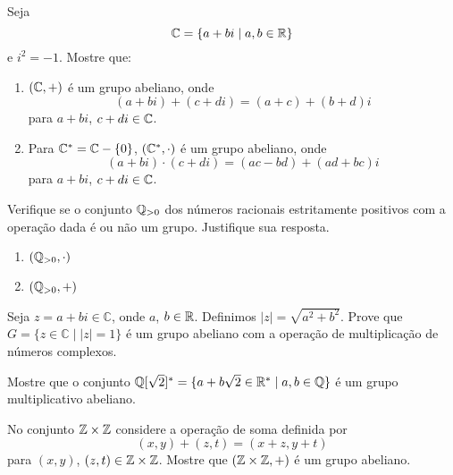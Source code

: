 \documentclass[12pt]{exam}
\begin{document}
    \vspace{.3cm}

    \questao{} Seja
    \[
        \mathbb{C} = \{a + bi \mid a, b \in \mathbb{R}\}
    \]
    e $i^2 = -1$. Mostre que:
    \begin{enumerate}[label=({\alph*})]
        \item $(\mathbb{C}, +)$ é um grupo abeliano, onde
        \[
            (a + bi) + (c + di) = (a + c) + (b + d)i
        \]
        para $a + bi$, $c + di \in \mathbb{C}$.
        \item Para $\mathbb{C}^* = \mathbb{C} - \{0\}$, $(\mathbb{C}^*, \cdot)$ é um grupo abeliano, onde
        \[
            (a + bi)\cdot (c + di) = (ac - bd) + (ad + bc)i
        \]
        para $a + bi$, $c + di \in \mathbb{C}$.
    \end{enumerate}

    \vspace{.3cm}

    \questao{} Verifique se o conjunto $\mathbb{Q}_{>0}$ dos números racionais estritamente positivos com a
     operação dada é ou não um grupo. Justifique sua
    resposta.
    \begin{multicols}{2}
        \begin{enumerate}[label=({\alph*})]
            \item $(\mathbb{Q}_{>0},\cdot)$

            \item $(\mathbb{Q}_{>0}, +)$
        \end{enumerate}
    \end{multicols}

    \vspace{.3cm}

    \questao{} Seja $z  = a + bi \in \mathbb{C}$, onde $a$, $b \in \mathbb{R}$. Definimos $|z| = \sqrt{a^2 + b^2}$. Prove que $G=\{z \in \mathbb{C} \mid |z| = 1\}$ é um grupo
    abeliano com a operação de multiplicação de números complexos.

    \vspace{.3cm}

    \questao{} Mostre que o conjunto $\mathbb{Q}[\sqrt{2}]^*=\{ a + b\sqrt{2} \in
    \mathbb{R}^* \mid  a, b \in \mathbb{Q} \}$ é um grupo multiplicativo abeliano.

    \vspace{.3cm}

    \questao{} No conjunto $\mathbb{Z} \times \mathbb{Z}$ considere a operação de soma definida por
    \[
        (x, y) + (z, t) = (x + z, y + t)
    \]
    para $(x, y)$, $(z, t) \in \mathbb{Z} \times \mathbb{Z}$. Mostre que $(\mathbb{Z}\times\mathbb{Z}, +)$ é um grupo abeliano.
\end{document}

